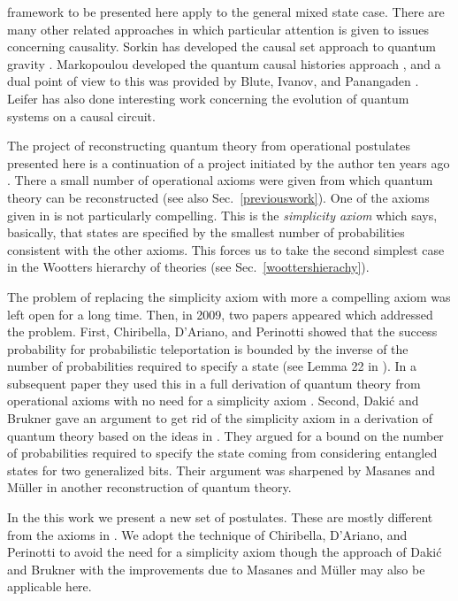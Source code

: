 \documentclass[10pt]{article}
\begin{document}
framework to be presented here apply to the general mixed state case.   There are many other related approaches in which particular attention is given to issues concerning causality.  Sorkin has developed the causal set approach to quantum gravity \cite{sorkin1991spacetime}. Markopoulou developed the quantum causal histories approach \cite{markopoulou2000quantum}, and a dual point of view to this was provided by Blute, Ivanov, and Panangaden \cite{blute2003discrete}.  Leifer \cite{leifer2006quantum} has also done interesting work concerning the evolution of quantum systems on a causal circuit.

The project of reconstructing quantum theory from operational postulates presented here is a continuation of a project initiated by the author ten years ago \cite{hardy2001quantum}.  There a small number of operational axioms were given from which quantum theory can be reconstructed (see also Sec.\ \ref{previouswork}).  One of the axioms given in \cite{hardy2001quantum} is not particularly compelling.  This is the \emph{simplicity axiom} which says, basically, that states are specified by the smallest
number of probabilities consistent with the other axioms.  This forces us to take the second simplest case in the Wootters hierarchy \cite{wootters1990local, wootters1986quantum} of theories (see Sec.\ \ref{woottershierachy}).

The problem of replacing the simplicity axiom with more a compelling axiom was left open for a long time.  Then, in 2009, two papers appeared which addressed the problem.  First, Chiribella, D'Ariano, and Perinotti \cite{chiribella2010probabilistic} showed that the success probability for probabilistic teleportation is bounded by the inverse of the number of probabilities required to specify a state (see Lemma 22 in \cite{chiribella2010probabilistic}). In a subsequent paper they used this in a full derivation of quantum theory from operational axioms with no need for a simplicity axiom \cite{chiribella2010informational}.   Second, Daki\'c and Brukner \cite{dakic2009quantum} gave an argument to get rid of the simplicity axiom in a derivation of quantum theory based on the ideas in \cite{hardy2001quantum}.  They argued for a bound on the number of probabilities required to specify the state coming from considering entangled states for two generalized bits. Their argument was sharpened by Masanes and M\"uller \cite{masanes2010derivation} in another reconstruction of quantum theory.

In the this work we present a new set of postulates. These are mostly different from the axioms in \cite{hardy2001quantum}.   We adopt the technique of Chiribella, D'Ariano, and Perinotti \cite{chiribella2010probabilistic, chiribella2010informational} to avoid the need for a simplicity axiom though the approach of Daki\'c and Brukner \cite{dakic2009quantum} with the improvements due to Masanes and M\"uller \cite{masanes2010derivation} may also be applicable here.
\end{document}
